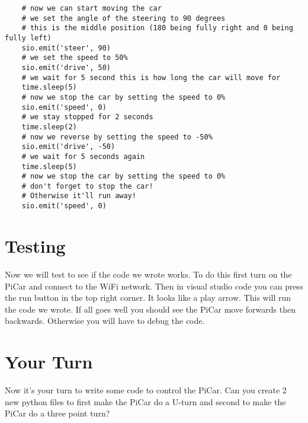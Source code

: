 \documentclass[11pt]{report}
\begin{document}
    \begin{verbatim}
    # now we can start moving the car
    # we set the angle of the steering to 90 degrees
    # this is the middle position (180 being fully right and 0 being fully left)
    sio.emit('steer', 90)
    # we set the speed to 50%
    sio.emit('drive', 50)
    # we wait for 5 second this is how long the car will move for
    time.sleep(5)
    # now we stop the car by setting the speed to 0%
    sio.emit('speed', 0)
    # we stay stopped for 2 seconds
    time.sleep(2)
    # now we reverse by setting the speed to -50%
    sio.emit('drive', -50)
    # we wait for 5 seconds again
    time.sleep(5)
    # now we stop the car by setting the speed to 0%
    # don't forget to stop the car!
    # Otherwise it'll run away!
    sio.emit('speed', 0)
    \end{verbatim}

    \section{Testing}
    Now we will test to see if the code we wrote works. To do this first turn on the PiCar and connect to the WiFi network. Then in visual studio code you can press the run button in the top right corner. It looks like a play arrow. This will run the code we wrote. If all goes well you should see the PiCar move forwards then backwards. Otherwise you will have to debug the code. 

    \pagebreak
    \section{Your Turn}

    Now it's your turn to write some code to control the PiCar. Can you create 2 new python files to first make the PiCar do a U-turn and second to make the PiCar do a three point turn?





   
\end{document}
